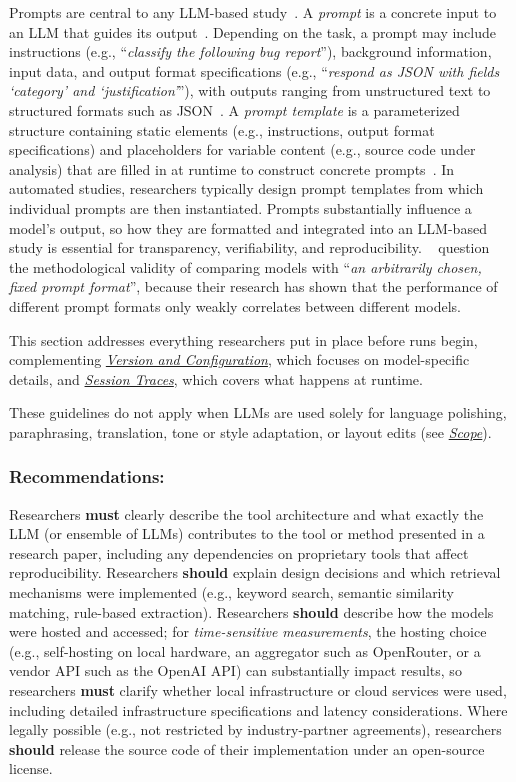 \documentclass[smallextended]{svjour3}
\newcommand*{\enq}[1]{\enquote{{\itshape#1}}}
\newcommand{\must}{\textbf{must}\xspace}
\newcommand{\should}{\textbf{should}\xspace}
\newcommand{\scope}{\hyperref[sec:scope]{\emph{Scope}}\xspace}
\newcommand{\scope}{\href{/scope/}{\emph{Scope}}\xspace}
\newcommand{\modelversion}{\hyperref[sec:report-model-version-configuration-and-customizations]{\emph{Version and Configuration}}\xspace}
\newcommand{\traces}{\hyperref[sec:report-session-traces]{\emph{Session Traces}}\xspace}
\newcommand{\modelversion}{\href{/guidelines\#report-model-version-configuration-and-customizations}{\emph{Version and Configuration}}\xspace}
\newcommand{\traces}{\href{/guidelines\#report-session-traces}{\emph{Session Traces}}\xspace}
\newcommand{\guidelinesubsubsection}[1]{\subsubsection{\bfseries #1:}}
\newcommand{\guidelinesubsubsection}[1]{\subsubsection{#1}}
\begin{document}
Prompts are central to any LLM-based study~\cite{DBLP:conf/iclr/Sclar0TS24}.
A \emph{prompt} is a concrete input to an LLM that guides its output~\cite{DBLP:journals/corr/abs-2406-06608}.
Depending on the task, a prompt may include instructions (e.g., \enq{classify the following bug report}), background information, input data, and output format specifications (e.g., \enq{respond as JSON with fields `category' and `justification'}), with outputs ranging from unstructured text to structured formats such as JSON~\cite{promptingguide_elements}.
A \emph{prompt template} is a parameterized structure containing static elements (e.g., instructions, output format specifications) and placeholders for variable content (e.g., source code under analysis) that are filled in at runtime to construct concrete prompts~\cite{DBLP:journals/corr/abs-2406-06608}.
In automated studies, researchers typically design prompt templates from which individual prompts are then instantiated.
Prompts substantially influence a model's output, so how they are formatted and integrated into an LLM-based study is essential for transparency, verifiability, and reproducibility.
\citeauthor{DBLP:conf/iclr/Sclar0TS24}~\cite{DBLP:conf/iclr/Sclar0TS24} question the methodological validity of comparing models with \enq{an arbitrarily chosen, fixed prompt format}, because their research has shown that the performance of different prompt formats only weakly correlates between different models.

This section addresses everything researchers put in place before runs begin, complementing \modelversion, which focuses on model-specific details, and \traces, which covers what happens at runtime.

These guidelines do not apply when LLMs are used solely for language polishing, paraphrasing, translation, tone or style adaptation, or layout edits (see \scope).

\guidelinesubsubsection{Recommendations}

Researchers \must clearly describe the tool architecture and what exactly the LLM (or ensemble of LLMs) contributes to the tool or method presented in a research paper, including any dependencies on proprietary tools that affect reproducibility.
Researchers \should explain design decisions and which retrieval mechanisms were implemented (e.g., keyword search, semantic similarity matching, rule-based extraction).
Researchers \should describe how the models were hosted and accessed; for \emph{time-sensitive measurements}, the hosting choice (e.g., self-hosting on local hardware, an aggregator such as OpenRouter, or a vendor API such as the OpenAI API) can substantially impact results, so researchers \must clarify whether local infrastructure or cloud services were used, including detailed infrastructure specifications and latency considerations.
Where legally possible (e.g., not restricted by industry-partner agreements), researchers \should release the source code of their implementation under an open-source license.
\end{document}
